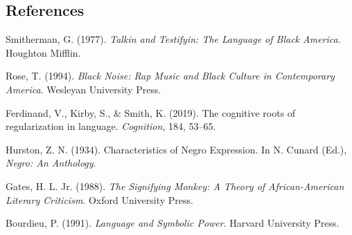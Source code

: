 \documentclass[11pt,letterpaper]{article}
\begin{document}
\subsection*{References}
\begin{enumerate}[label={[\arabic*]},noitemsep,topsep=1pt]
\small
\item Smitherman, G. (1977). \textit{Talkin and Testifyin: The Language of Black America}. Houghton Mifflin.
\item Rose, T. (1994). \textit{Black Noise: Rap Music and Black Culture in Contemporary America}. Wesleyan University Press.
\item Ferdinand, V., Kirby, S., \& Smith, K. (2019). The cognitive roots of regularization in language. \textit{Cognition}, 184, 53--65.
\item Hurston, Z. N. (1934). Characteristics of Negro Expression. In N. Cunard (Ed.), \textit{Negro: An Anthology}.
\item Gates, H. L. Jr. (1988). \textit{The Signifying Monkey: A Theory of African-American Literary Criticism}. Oxford University Press.
\item Bourdieu, P. (1991). \textit{Language and Symbolic Power}. Harvard University Press.
\end{enumerate}
\end{document}
